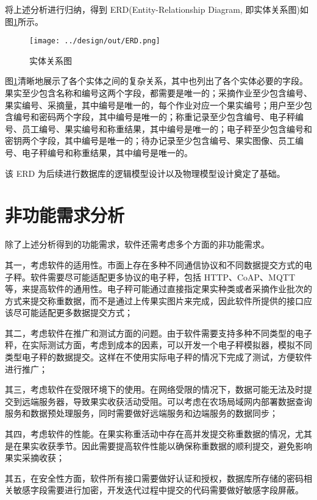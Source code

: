 将上述分析进行归纳，得到 ERD(Entity-Relationship Diagram, 即实体关系图)如图\ref{fig:ERD}所示。

\begin{figure}[H]
    \centering
    \texttt{[image: ../design/out/ERD.png]}
    \caption{实体关系图}
    \label{fig:ERD}
\end{figure}

图\ref{fig:ERD}清晰地展示了各个实体之间的复杂关系，其中也列出了各个实体必要的字段。果实至少包含名称和编号这两个字段，都需要是唯一的；采摘作业至少包含编号、果实编号、采摘量，其中编号是唯一的，每个作业对应一个果实编号；用户至少包含编号和密码两个字段，其中编号是唯一的；称重记录至少包含编号、电子秤编号、员工编号、果实编号和称重结果，其中编号是唯一的；电子秤至少包含编号和密钥两个字段，其中编号是唯一的；待办记录至少包含编号、果实图像、员工编号、电子秤编号和称重结果，其中编号是唯一的。

该 ERD 为后续进行数据库的逻辑模型设计以及物理模型设计奠定了基础。

\section{非功能需求分析}\label{sec:req2}

除了上述分析得到的功能需求，软件还需考虑多个方面的非功能需求。

其一，考虑软件的适用性。市面上存在多种不同通信协议和不同数据提交方式的电子秤。软件需要尽可能适配更多协议的电子秤，包括 HTTP、CoAP、MQTT 等，来提高软件的通用性。电子秤可能通过直接指定果实种类或者采摘作业批次的方式来提交称重数据，而不是通过上传果实图片来完成，因此软件所提供的接口应该尽可能适配更多数据提交方式；

其二，考虑软件在推广和测试方面的问题。由于软件需要支持多种不同类型的电子秤，在实际测试方面，考虑到成本的因素，可以开发一个电子秤模拟器，模拟不同类型电子秤的数据提交。这样在不使用实际电子秤的情况下完成了测试，方便软件进行推广；

其三，考虑软件在受限环境下的使用。在网络受限的情况下，数据可能无法及时提交到远端服务器，导致果实收获活动受阻。可以考虑在农场局域网内部署数据查询服务和数据预处理服务，同时需要做好远端服务和边端服务的数据同步；

其四，考虑软件的性能。在果实称重活动中存在高并发提交称重数据的情况，尤其是在果实收获季节。因此需要提高软件性能以确保称重数据的顺利提交，避免影响果实采摘收获；

其五，在安全性方面，软件所有接口需要做好认证和授权，数据库所存储的密码相关敏感字段需要进行加密，开发迭代过程中提交的代码需要做好敏感字段屏蔽。

